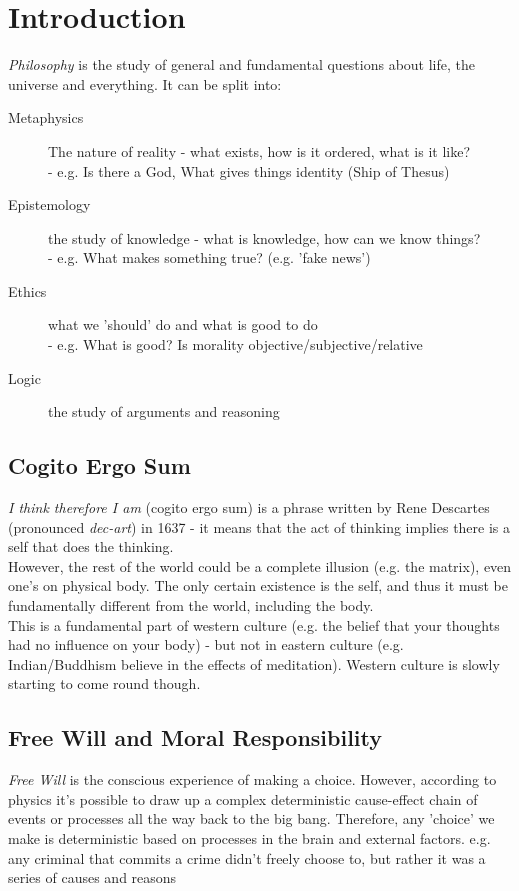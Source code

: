 \section{Introduction}
\emph{Philosophy} is the study of general and fundamental questions about life, the universe and everything. It can be split into:
\begin{description}
    \item[Metaphysics] The nature of reality - what exists, how is it ordered, what is it like? \\ \quad -  e.g. Is there a God, What gives things identity (Ship of Thesus)
    \item[Epistemology] the study of knowledge - what is knowledge, how can we know things? 
    \\ \quad -  e.g. What makes something true? (e.g. 'fake news')
    \item[Ethics] what we 'should' do and what is good to do
    \\ \quad -  e.g. What is good? Is morality objective/subjective/relative
    \item[Logic] the study of arguments and reasoning
\end{description}

\subsection{Cogito Ergo Sum}
\emph{I think therefore I am} (cogito ergo sum) is a phrase written by Rene Descartes (pronounced \emph{dec-art}) in 1637 - it means that the act of thinking implies there is a self that does the thinking.\\ However, the rest of the world could be a complete illusion (e.g. the matrix), even one's on physical body. The only certain existence is the self, and thus it must be fundamentally different from the world, including the body.\\
This is a fundamental part of western culture (e.g. the belief that your thoughts had no influence on your body) - but not in eastern culture (e.g. Indian/Buddhism believe in the effects of meditation). Western culture is slowly starting to come round though.

\subsection{Free Will and Moral Responsibility}
\emph{Free Will} is the conscious experience of making a choice. However, according to physics it's possible to draw up a complex deterministic cause-effect chain of events or processes all the way back to the big bang. Therefore, any 'choice' we make is deterministic based on processes in the brain and external factors. e.g. any criminal that commits a crime didn't freely choose to, but rather it was a series of causes and reasons \\

